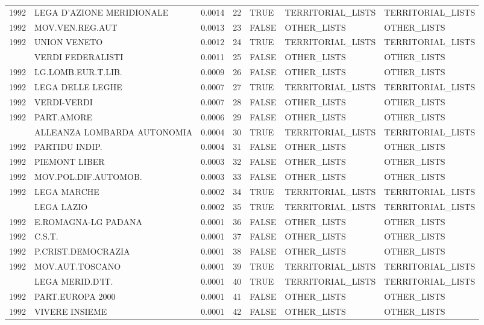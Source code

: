 \begin{longtable}[t]{rlrrlll}
1992 & LEGA D'AZIONE MERIDIONALE & 0.0014 & 22 & TRUE & TERRITORIAL\_LISTS & TERRITORIAL\_LISTS\\
1992 & MOV.VEN.REG.AUT & 0.0013 & 23 & FALSE & OTHER\_LISTS & OTHER\_LISTS\\
1992 & UNION VENETO & 0.0012 & 24 & TRUE & TERRITORIAL\_LISTS & TERRITORIAL\_LISTS\\
\addlinespace
1992 & VERDI FEDERALISTI & 0.0011 & 25 & FALSE & OTHER\_LISTS & OTHER\_LISTS\\
1992 & LG.LOMB.EUR.T.LIB. & 0.0009 & 26 & FALSE & OTHER\_LISTS & OTHER\_LISTS\\
1992 & LEGA DELLE LEGHE & 0.0007 & 27 & TRUE & TERRITORIAL\_LISTS & TERRITORIAL\_LISTS\\
1992 & VERDI-VERDI & 0.0007 & 28 & FALSE & OTHER\_LISTS & OTHER\_LISTS\\
1992 & PART.AMORE & 0.0006 & 29 & FALSE & OTHER\_LISTS & OTHER\_LISTS\\
\addlinespace
1992 & ALLEANZA LOMBARDA AUTONOMIA & 0.0004 & 30 & TRUE & TERRITORIAL\_LISTS & TERRITORIAL\_LISTS\\
1992 & PARTIDU INDIP. & 0.0004 & 31 & FALSE & OTHER\_LISTS & OTHER\_LISTS\\
1992 & PIEMONT LIBER & 0.0003 & 32 & FALSE & OTHER\_LISTS & OTHER\_LISTS\\
1992 & MOV.POL.DIF.AUTOMOB. & 0.0003 & 33 & FALSE & OTHER\_LISTS & OTHER\_LISTS\\
1992 & LEGA MARCHE & 0.0002 & 34 & TRUE & TERRITORIAL\_LISTS & TERRITORIAL\_LISTS\\
\addlinespace
1992 & LEGA LAZIO & 0.0002 & 35 & TRUE & TERRITORIAL\_LISTS & TERRITORIAL\_LISTS\\
1992 & E.ROMAGNA-LG PADANA & 0.0001 & 36 & FALSE & OTHER\_LISTS & OTHER\_LISTS\\
1992 & C.S.T. & 0.0001 & 37 & FALSE & OTHER\_LISTS & OTHER\_LISTS\\
1992 & P.CRIST.DEMOCRAZIA & 0.0001 & 38 & FALSE & OTHER\_LISTS & OTHER\_LISTS\\
1992 & MOV.AUT.TOSCANO & 0.0001 & 39 & TRUE & TERRITORIAL\_LISTS & TERRITORIAL\_LISTS\\
\addlinespace
1992 & LEGA MERID.D'IT. & 0.0001 & 40 & TRUE & TERRITORIAL\_LISTS & TERRITORIAL\_LISTS\\
1992 & PART.EUROPA 2000 & 0.0001 & 41 & FALSE & OTHER\_LISTS & OTHER\_LISTS\\
1992 & VIVERE INSIEME & 0.0001 & 42 & FALSE & OTHER\_LISTS & OTHER\_LISTS\\

\end{longtable}
